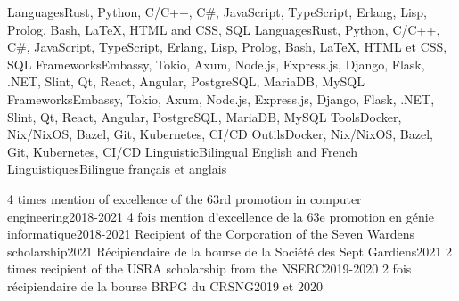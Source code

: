     \resumeEnumerationStart
        \resumeEnumerationEnFr
            {Languages}{Rust, Python, C/C++, C\#, JavaScript, TypeScript, Erlang, Lisp, Prolog, Bash, LaTeX, HTML and CSS, SQL}
            {Languages}{Rust, Python, C/C++, C\#, JavaScript, TypeScript, Erlang, Lisp, Prolog, Bash, LaTeX, HTML et CSS, SQL}
        \resumeEnumerationEnFr
            {Frameworks}{Embassy, Tokio, Axum, Node.js, Express.js, Django, Flask, .NET, Slint, Qt, React, Angular, PostgreSQL, MariaDB, MySQL}
            {Frameworks}{Embassy, Tokio, Axum, Node.js, Express.js, Django, Flask, .NET, Slint, Qt, React, Angular, PostgreSQL, MariaDB, MySQL}
        \resumeEnumerationEnFr
            {Tools}{Docker, Nix/NixOS, Bazel, Git, Kubernetes, CI/CD}
            {Outils}{Docker, Nix/NixOS, Bazel, Git, Kubernetes, CI/CD}
        \resumeEnumerationEnFr
            {Linguistic}{Bilingual English and French}
            {Linguistiques}{Bilingue français et anglais}
    \resumeEnumerationEnd


    \resumeSubHeadingListStart
        \resumeDatedItemEnFr
            {4 times mention of excellence of the 63rd promotion in computer engineering}{2018-2021}
            {4 fois mention d’excellence de la 63e promotion en génie informatique}{2018-2021}
        \resumeDatedItemEnFr
            {Recipient of the Corporation of the Seven Wardens scholarship}{2021}
            {Récipiendaire de la bourse de la Société des Sept Gardiens}{2021}
        \resumeDatedItemEnFr
            {2 times recipient of the USRA scholarship from the NSERC}{2019-2020}
            {2 fois récipiendaire de la bourse BRPG du CRSNG}{2019 et 2020}
    \resumeSubHeadingListEnd
